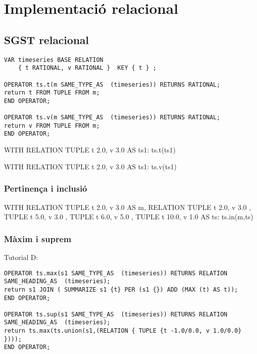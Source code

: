 \chapter{Implementació relacional}





\section{SGST relacional}



\begin{verbatim}
VAR timeseries BASE RELATION
    { t RATIONAL, v RATIONAL }  KEY { t } ;

OPERATOR ts.t(m SAME_TYPE_AS  (timeseries)) RETURNS RATIONAL;
return t FROM TUPLE FROM m;
END OPERATOR;

OPERATOR ts.v(m SAME_TYPE_AS  (timeseries)) RETURNS RATIONAL;
return v FROM TUPLE FROM m;
END OPERATOR;
\end{verbatim}




WITH RELATION {
TUPLE { t 2.0, v 3.0 }
 } AS ts1: 
ts.t(ts1)


WITH RELATION {
TUPLE { t 2.0, v 3.0 }
 } AS ts1: 
ts.v(ts1)


\subsection{Pertinença i inclusió}


WITH RELATION {
TUPLE { t 2.0, v 3.0 }
 } AS m,
RELATION {
TUPLE { t 2.0, v 3.0 },
TUPLE { t 5.0, v 3.0 },
TUPLE { t 6.0, v 5.0 },
TUPLE { t 10.0, v 1.0 }
 } AS ts: 
ts.in(m,ts)


\subsection{Màxim i suprem}

Tutorial D:
\begin{verbatim}
OPERATOR ts.max(s1 SAME_TYPE_AS  (timeseries)) RETURNS RELATION SAME_HEADING_AS  (timeseries);
return s1 JOIN ( SUMMARIZE s1 {t} PER (s1 {}) ADD (MAX (t) AS t));
END OPERATOR;

OPERATOR ts.sup(s1 SAME_TYPE_AS  (timeseries)) RETURNS RELATION SAME_HEADING_AS  (timeseries);
return ts.max(ts.union(s1,(RELATION { TUPLE {t -1.0/0.0, v 1.0/0.0} })));
END OPERATOR;
\end{verbatim}



